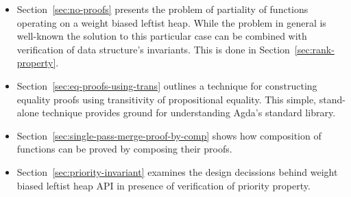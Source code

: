 \begin{itemize}
 \item Section~\ref{sec:no-proofs} presents the problem of partiality of functions operating on a weight biased leftist heap. While the problem in general is well-known the solution to this particular case can be combined with verification of data structure's invariants. This is done in Section~\ref{sec:rank-property}.
 \item Section~\ref{sec:eq-proofs-using-trans} outlines a technique for constructing equality proofs using transitivity of propositional equality. This simple, stand-alone technique provides ground for understanding Agda's standard library.
 \item Section~\ref{sec:single-pass-merge-proof-by-comp} shows how composition of functions can be proved by composing their proofs.
 \item Section~\ref{sec:priority-invariant} examines the design decissions behind weight biased leftist heap API in presence of verification of priority property.
\end{itemize}
